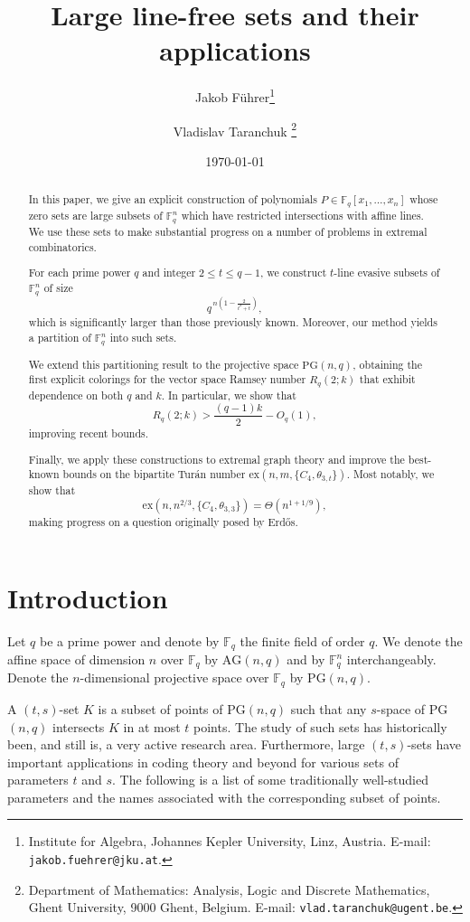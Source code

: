 \documentclass[12pt]{article}
\author{
Jakob F\"uhrer\thanks{Institute for Algebra, Johannes Kepler University, Linz, Austria. E-mail: {\tt jakob.fuehrer@jku.at}.}
\and
Vladislav Taranchuk \thanks{Department of Mathematics: Analysis, Logic and Discrete Mathematics, Ghent University, 9000 Ghent, Belgium. E-mail: {\tt vlad.taranchuk@ugent.be}.}
}
\title{Large line-free sets and their applications}
\newcommand{\F}{\mathbb{F}}
\newcommand{\PG}{\text{PG}}
\newcommand{\AG}{\text{AG}}
\begin{document}
\date{\today}
\maketitle




\begin{abstract}
In this paper, we give an explicit construction of polynomials \( P \in \mathbb{F}_q[x_1,\dots,x_n] \) whose zero sets are large subsets of $\F_q^n$ which have restricted intersections with affine lines. We use these sets to make substantial progress on a number of problems in extremal combinatorics.

For each prime power \( q \) and integer \( 2 \le t \le q-1 \), we construct \( t \)-line evasive subsets of \( \mathbb{F}_q^n \) of size
\[
q^{\,n\left(1-\frac{2}{t^2+t}\right)},
\]
which is significantly larger than those previously known. Moreover, our method yields a partition of \( \mathbb{F}_q^n \) into such sets.

We extend this partitioning result to the projective space \( \PG(n,q) \), obtaining the first explicit colorings for the vector space Ramsey number \( R_q(2;k) \) that exhibit dependence on both \( q \) and \( k \). In particular, we show that
\[
R_q(2;k) > \frac{(q-1)k}{2} - O_q(1),
\]
improving recent bounds.

Finally, we apply these constructions to extremal graph theory and improve the best-known bounds on the bipartite Tur\'an number \( \mathrm{ex}(n,m,\{C_4,\theta_{3,t}\}) \). Most notably, we show that
\[
\mathrm{ex}(n,n^{2/3},\{C_4,\theta_{3,3}\}) = \Theta(n^{1+1/9}),
\]
making progress on a question originally posed by Erd\H{o}s.
\end{abstract}





\section{Introduction}

Let $q$ be a prime power and denote by $\F_q$ the finite field of order $q$. We denote the affine space of dimension $n$ over $\F_q$ by $\AG(n, q)$ and by $\F_q^n$ interchangeably. Denote the $n$-dimensional projective space over $\F_q$ by PG$(n, q)$.

A  $(t, s)$-set $K$ is a subset of points of PG$(n, q)$ such that any $s$-space of PG$(n, q)$ intersects $K$ in at most $t$ points. The study of such sets has historically been, and still is, a very active research area. Furthermore, large $(t, s)$-sets have important applications in coding theory and beyond \cite{HirschfeldStorme2001} for various sets of parameters $t$ and $s$. The following is a list of some traditionally well-studied parameters and the names associated with the corresponding subset of points.
\end{document}
